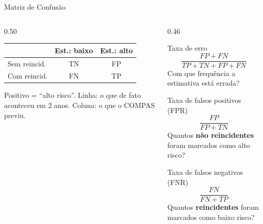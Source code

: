 \documentclass[aspectratio=169,xcolor=dvipsnames]{beamer}
\begin{document}
  \begin{frame}{Matriz de Confusão}
    \begin{columns}[T]
      \begin{column}{0.50\textwidth}
        \centering
        \renewcommand{\arraystretch}{1.3}
        \begin{tabular}{lcc}
          \toprule
           & \textbf{Est.: baixo} & \textbf{Est.: alto} \\
          \midrule
          Sem reincid. & TN & FP \\
          Com reincid. & FN & TP \\
          \bottomrule
        \end{tabular}

        \vspace{0.5em}
        \footnotesize Positivo = \enquote{alto risco}. Linha: o que de fato aconteceu em 2 anos. Coluna: o que o COMPAS previu.
      \end{column}
      \begin{column}{0.46\textwidth}
        \footnotesize
        \begin{block}{\small Taxa de erro}
          \[ \frac{FP + FN}{TP+TN+FP+FN} \]
          Com que frequência a estimativa está errada?
        \end{block}
        \begin{block}{\small Taxa de falsos positivos (FPR)}
          \[ \frac{FP}{FP + TN} \]
          Quantos \textbf{não reincidentes} foram marcados como alto risco?
        \end{block}
        \begin{block}{\small Taxa de falsos negativos (FNR)}
          \[ \frac{FN}{FN + TP} \]
          Quantos \textbf{reincidentes} foram marcados como baixo risco?
        \end{block}
      \end{column}
    \end{columns}
  \end{frame}
\end{document}
